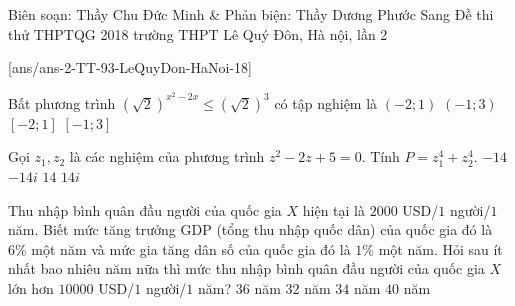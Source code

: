 \begin{name}
{Biên soạn: Thầy Chu Đức Minh \& Phản biện: Thầy Dương Phước Sang}
{Đề thi thử THPTQG 2018 trường THPT Lê Quý Đôn, Hà nội, lần 2}
\end{name}
\setcounter{ex}{0}\setcounter{bt}{0}
[ans/ans-2-TT-93-LeQuyDon-HaNoi-18]

\begin{ex}%
Bất phương trình $\left(\sqrt{2}\right)^{x^2-2x} \leq \left(\sqrt{2}\right)^3$ có tập nghiệm là 
	\choice
	{$(-2; 1)$}
	{$(-1; 3)$}
	{$[-2; 1]$}
	{\True $[-1; 3]$}
\end{ex}

\begin{ex}%
Gọi $z_1, z_2$ là các nghiệm của phương trình $z^2-2z + 5 = 0$. Tính $P = z_1^4 + z_2^4$. 
	\choice
	{\True $-14$}
	{$-14i$}
	{$14$}
	{$14i$}
\end{ex}

\begin{ex}%
Thu nhập bình quân đầu người của quốc gia $X$ hiện tại là $2000$ USD/$1$ người/$1$ năm. Biết mức tăng trưởng GDP (tổng thu nhập quốc dân) của quốc gia đó là $6\%$ một năm và mức gia tăng dân số của quốc gia đó là $1\%$ một năm. Hỏi sau ít nhất bao nhiêu năm nữa thì mức thu nhập bình quân đầu người của quốc gia $X$ lớn hơn $10 000$ USD/$1$ người/$1$ năm?
	\choice
	{$36$ năm}
	{$32$ năm}
	{\True $34$ năm}
	{$40$ năm}
\end{ex}

